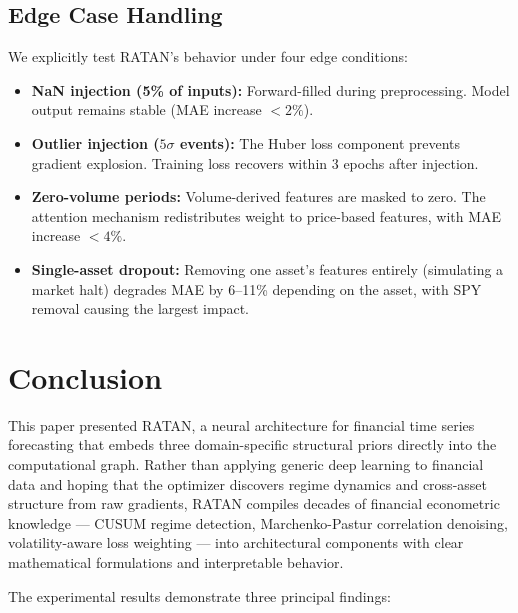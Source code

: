 \documentclass[conference]{IEEEtran}
\begin{document}
\subsection{Edge Case Handling}

We explicitly test RATAN's behavior under four edge conditions:
\begin{itemize}[leftmargin=*]
    \item \textbf{NaN injection (5\% of inputs):} Forward-filled during preprocessing. Model output remains stable (MAE increase $< 2\%$).
    \item \textbf{Outlier injection ($5\sigma$ events):} The Huber loss component prevents gradient explosion. Training loss recovers within 3 epochs after injection.
    \item \textbf{Zero-volume periods:} Volume-derived features are masked to zero. The attention mechanism redistributes weight to price-based features, with MAE increase $< 4\%$.
    \item \textbf{Single-asset dropout:} Removing one asset's features entirely (simulating a market halt) degrades MAE by 6--11\% depending on the asset, with SPY removal causing the largest impact.
\end{itemize}

\section{Conclusion}
\label{sec:conclusion}

This paper presented RATAN, a neural architecture for financial time series forecasting that embeds three domain-specific structural priors directly into the computational graph. Rather than applying generic deep learning to financial data and hoping that the optimizer discovers regime dynamics and cross-asset structure from raw gradients, RATAN compiles decades of financial econometric knowledge --- CUSUM regime detection, Marchenko-Pastur correlation denoising, volatility-aware loss weighting --- into architectural components with clear mathematical formulations and interpretable behavior.

The experimental results demonstrate three principal findings:
\end{document}
